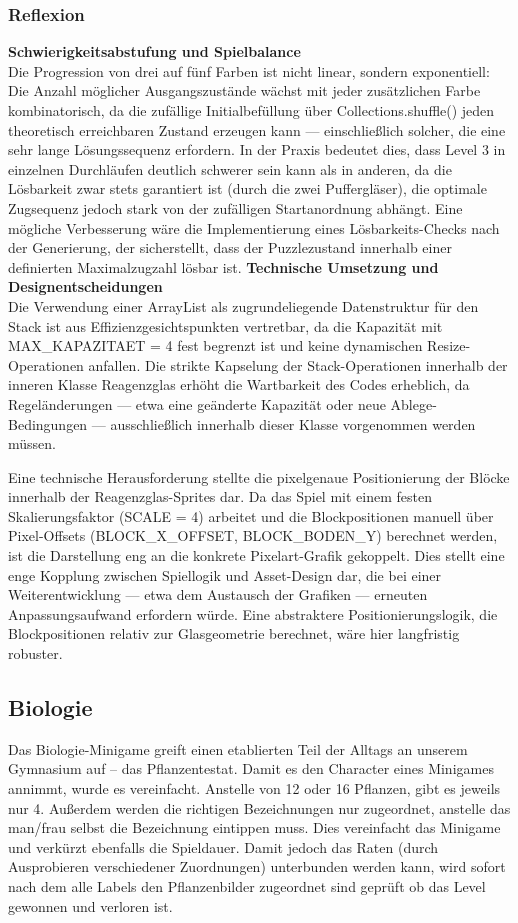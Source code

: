 \subsubsection{Reflexion}
\textbf{Schwierigkeitsabstufung und Spielbalance} \\
Die Progression von drei auf fünf Farben ist nicht linear, sondern exponentiell: Die Anzahl möglicher Ausgangszustände wächst mit jeder zusätzlichen Farbe kombinatorisch, da die zufällige Initialbefüllung über Collections.shuffle() jeden theoretisch erreichbaren Zustand erzeugen kann — einschließlich solcher, die eine sehr lange Lösungssequenz erfordern. In der Praxis bedeutet dies, dass Level 3 in einzelnen Durchläufen deutlich schwerer sein kann als in anderen, da die Lösbarkeit zwar stets garantiert ist (durch die zwei Puffergläser), die optimale Zugsequenz jedoch stark von der zufälligen Startanordnung abhängt. Eine mögliche Verbesserung wäre die Implementierung eines Lösbarkeits-Checks nach der Generierung, der sicherstellt, dass der Puzzlezustand innerhalb einer definierten Maximalzugzahl lösbar ist.
\textbf{Technische Umsetzung und Designentscheidungen} \\
Die Verwendung einer ArrayList als zugrundeliegende Datenstruktur für den Stack ist aus Effizienzgesichtspunkten vertretbar, da die Kapazität mit MAX\_KAPAZITAET = 4 fest begrenzt ist und keine dynamischen Resize-Operationen anfallen. Die strikte Kapselung der Stack-Operationen innerhalb der inneren Klasse Reagenzglas erhöht die Wartbarkeit des Codes erheblich, da Regeländerungen — etwa eine geänderte Kapazität oder neue Ablege-Bedingungen — ausschließlich innerhalb dieser Klasse vorgenommen werden müssen.

Eine technische Herausforderung stellte die pixelgenaue Positionierung der Blöcke innerhalb der Reagenzglas-Sprites dar. Da das Spiel mit einem festen Skalierungsfaktor (SCALE = 4) arbeitet und die Blockpositionen manuell über Pixel-Offsets (BLOCK\_X\_OFFSET, BLOCK\_BODEN\_Y) berechnet werden, ist die Darstellung eng an die konkrete Pixelart-Grafik gekoppelt. Dies stellt eine enge Kopplung zwischen Spiellogik und Asset-Design dar, die bei einer Weiterentwicklung — etwa dem Austausch der Grafiken — erneuten Anpassungsaufwand erfordern würde. Eine abstraktere Positionierungslogik, die Blockpositionen relativ zur Glasgeometrie berechnet, wäre hier langfristig robuster.

\subsection{Biologie}
Das Biologie-Minigame greift einen etablierten Teil der Alltags an unserem Gymnasium auf – das Pflanzentestat.
Damit es den Character eines Minigames annimmt, wurde es vereinfacht. Anstelle von 12 oder 16 Pflanzen, gibt es jeweils nur 4. Außerdem werden die richtigen Bezeichnungen nur zugeordnet, anstelle das man/frau selbst die Bezeichnung eintippen muss. Dies vereinfacht das Minigame und verkürzt ebenfalls die Spieldauer.
Damit jedoch das Raten (durch Ausprobieren verschiedener Zuordnungen) unterbunden werden kann, wird sofort nach dem alle Labels den Pflanzenbilder zugeordnet sind geprüft ob das Level gewonnen und verloren ist.

